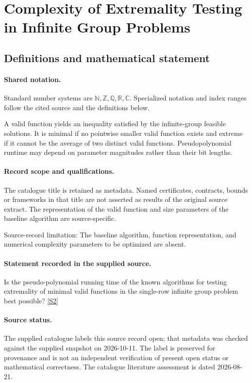\documentclass[11pt]{article}
\newcommand{\sref}[2]{\hyperlink{source:#1:#2}{[S#2]}}
\begin{document}
\section{Complexity of Extremality Testing in Infinite Group Problems}\label{statement}

\subsection{Definitions and mathematical statement}

\paragraph{Shared notation.}Standard number systems are $\mathbb N,\mathbb Z,\mathbb Q,\mathbb R,\mathbb C$. Specialized notation and index ranges follow the cited source and the definitions below.


A valid function yields an inequality satisfied by the infinite-group feasible solutions. It is minimal if no pointwise smaller valid function exists and extreme if it cannot be the average of two distinct valid functions. Pseudopolynomial runtime may depend on parameter magnitudes rather than their bit lengths.
\paragraph{Record scope and qualifications.}
The catalogue title is retained as metadata. Named certificates, contracts, bounds or frameworks in that title are not asserted as results of the original source extract.
The representation of the valid function and size parameters of the baseline algorithm are source-specific.

Source-record limitation: The baseline algorithm, function representation, and numerical complexity parameters to be optimized are absent.
\paragraph{Statement recorded in the supplied source.}
Is the pseudo-polynomial running time of the known algorithms for testing extremality of minimal valid functions in the single-row infinite group problem best possible? \sref{statement}{2}
\paragraph{Source status.}
The supplied catalogue labels this source record open; that metadata was checked against the supplied snapshot on 2026-10-11. The label is preserved for provenance and is not an independent verification of present open status or mathematical correctness. The catalogue literature assessment is dated 2026-08-21.
\end{document}

